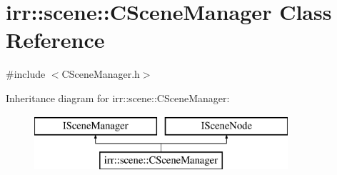 \hypertarget{classirr_1_1scene_1_1_c_scene_manager}{\section{irr\-:\-:scene\-:\-:C\-Scene\-Manager Class Reference}
\label{classirr_1_1scene_1_1_c_scene_manager}
}


{\ttfamily \#include $<$C\-Scene\-Manager.\-h$>$}

Inheritance diagram for irr\-:\-:scene\-:\-:C\-Scene\-Manager\-:\begin{figure}[H]
\begin{center}
\leavevmode
\includegraphics[height=2.000000cm]{classirr_1_1scene_1_1_c_scene_manager}
\end{center}
\end{figure}
